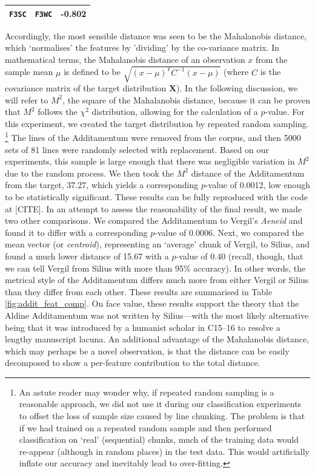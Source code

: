 \documentclass[11pt,a4paper]{scrartcl} %
\begin{document}
{\begin{table}
{\begin{tabular}{ | l | l | c |}
\texttt{F3SC} & \texttt{F3WC} & -0.802 \\
\hline
\end{tabular}}
\end{table}
Accordingly, the most sensible distance was seen to be the Mahalanobis distance, which `normalises' the features by 'dividing' by the co-variance matrix. In mathematical terms, the Mahalanobis distance of an observation $x$ from the sample mean $\mu$ is defined to be $\sqrt{(x-\mu)^{T}C^{-1}(x-\mu)}$ (where $C$ is the covariance matrix of the target distribution $\textbf{X}$). In the following discussion, we will refer to $M^{2}$, the square of the Mahalanobis distance, because it can be proven that $M^{2}$ follows the $\chi^{2}$ distribution, allowing for the calculation of a $p$-value. For this experiment, we created the target distribution by repeated random sampling.%
\footnote{An astute reader may wonder why, if repeated random sampling is a reasonable approach, we did not use it during our classification experiments to offset the loss of sample size caused by line chunking. The problem is that if we had trained on a repeated random sample and then performed classification on `real' (sequential) chunks, much of the training data would re-appear (although in random places) in the test data. This would artificially inflate our accuracy and inevitably lead to over-fitting.}
The lines of the Additamentum were removed from the corpus, and then 5000 sets of 81 lines were randomly selected with replacement. Based on our experiments, this sample is large enough that there was negligible variation in $M^{2}$ due to the random process. We then took the $M^{2}$ distance of the Additamentum from the target, 37.27, which yields a corresponding $p$-value of 0.0012, low enough to be statistically significant. These results can be fully reproduced with the code at [CITE]. In an attempt to assess the reasonability of the final result, we made two other comparisons. We compared the Additamentum to Vergil's \textit{Aeneid} and found it to differ with a corresponding $p$-value of 0.0006. Next, we compared the mean vector (or \textit{centroid}), representing an `average' chunk of Vergil, to Silius, and found a much lower distance of 15.67 with a $p$-value of 0.40 (recall, though, that we can tell Vergil from Silius with more than 95\% accuracy). In other words, the metrical style of the Additamentum differs much more from either Vergil or Silius than they differ from each other. These results are summarised in Table \ref{fig:addit_feat_comp}. On face value, these results support the theory that the Aldine Additamentum was not written by Silius---with the most likely alternative being that it was introduced by a humanist scholar in C15--16 to resolve a lengthy manuscript lacuna. An additional advantage of the Mahalanobis distance, which may perhaps be a novel observation, is that the distance can be easily decomposed to show a per-feature contribution to the total distance.%
}
\end{document}
